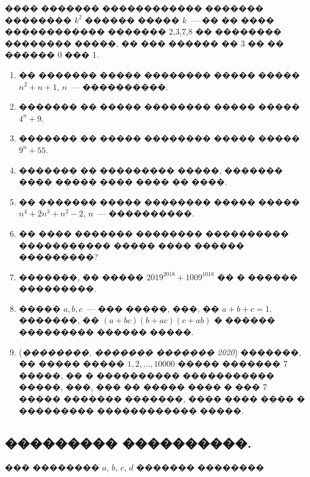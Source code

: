 \documentclass[a4paper,12pt]{article}
\begin{document}
���� ������� ������������ ������� �������� $k^{2}$ ������ ����� $k$~--- �� �� ���� ������������ ������� 2,3,7,8 �� �������� �������� �����, �� ��� ������ �� 3 �� �� ������ 0 ��� 1.

\medskip\medskip\medskip

\begin{enumerate}
 \item �� ������� ����� �������� ����� ����� $n^{2}+n+1$, $n$~--- ����������.

\item ������� �� ����� �������� ����� ����� $4^{n}+9$.

\item ������� �� ����� �������� ����� ����� $9^{n}+55$.

\item ������� �� ��������� �����, ������� ���� ����� ���� ���� �� ����.

\item �� ������� ����� �������� ����� ����� $n^{4}+2n^{3}+n^{2}-2$, $n$~--- ����������.

\item �� ���� ������� �������� ���������� ����������� ����� ���� ������ ���������?

\item �������, �� ����� $2019^{2018}+1009^{1018}$ �� � ������ ���������.

\item ����� $a,b,c$~--- ��� �����, ���, �� $a+b+c=1$. �������, �� $(a+bc)(b+ac)(c+ab)$ � ������ ��������� ������ �����.

\item (\textit{��������, ������� ������� 2020}) �������, �� ����� ����� $1,2,...,10000$ ����� ������� 7 �����, �� � ���������� ����������� �����, ���, ��� �� ����� ���� � ��� 7 ����� ������� �������, ���� ���� ���� � ��������� ������������ �����.
\end{enumerate}








\newpage

\begin{center}
\section*{��������� ����������.}
\end{center}

��� �������� $a$, $b$, $c$, $d$ ������� ��������
\end{document}
